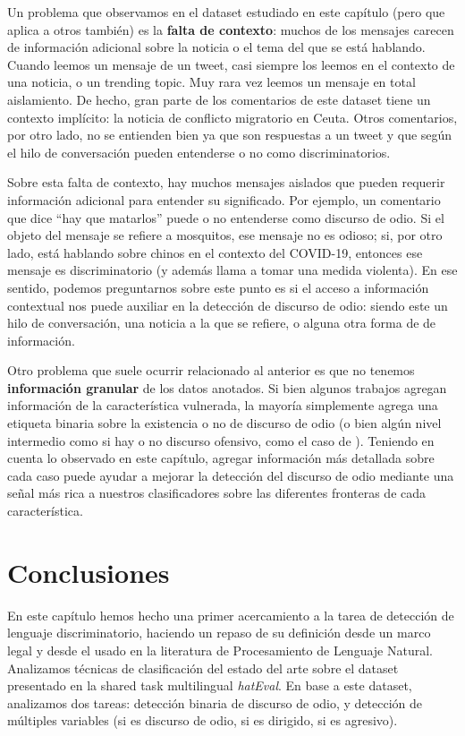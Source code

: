 
Un problema que observamos en el dataset estudiado en este capítulo (pero que aplica a otros también) es la \textbf{falta de contexto}: muchos de los mensajes carecen de información adicional sobre la noticia o el tema del que se está hablando. Cuando leemos un mensaje de un tweet, casi siempre los leemos en el contexto de una noticia, o un trending topic. Muy rara vez leemos un mensaje en total aislamiento. De hecho, gran parte de los comentarios de este dataset tiene un contexto implícito: la noticia de conflicto migratorio en Ceuta. Otros comentarios, por otro lado, no se entienden bien ya que son respuestas a un tweet y que según el hilo de conversación pueden entenderse o no como discriminatorios.

Sobre esta falta de contexto, hay muchos mensajes aislados que pueden requerir información adicional para entender su significado. Por ejemplo, un comentario que dice ``hay que matarlos'' puede o no entenderse como discurso de odio. Si el objeto del mensaje se refiere a mosquitos, ese mensaje no es odioso; si, por otro lado, está hablando sobre chinos en el contexto del COVID-19, entonces ese mensaje es discriminatorio (y además llama a tomar una medida violenta). En ese sentido, podemos preguntarnos sobre este punto es si el acceso a información contextual nos puede auxiliar en la detección de discurso de odio: siendo este un hilo de conversación, una noticia a la que se refiere, o alguna otra forma de de información.

Otro problema que suele ocurrir relacionado al anterior es que no tenemos \textbf{información granular} de los datos anotados. Si bien algunos trabajos agregan información de la característica vulnerada, la mayoría simplemente agrega una etiqueta binaria sobre la existencia o no de discurso de odio (o bien algún nivel intermedio como si hay o no discurso ofensivo, como el caso de \citet{Davidson2017AutomatedHS}). Teniendo en cuenta lo observado en este capítulo, agregar información más detallada sobre cada caso puede ayudar a mejorar la detección del discurso de odio mediante una señal más rica a nuestros clasificadores sobre las diferentes fronteras de cada característica.


\section{Conclusiones}

En este capítulo hemos hecho una primer acercamiento a la tarea de detección de lenguaje discriminatorio, haciendo un repaso de su definición desde un marco legal y desde el usado en la literatura de Procesamiento de Lenguaje Natural. Analizamos técnicas de clasificación del estado del arte sobre el dataset presentado en la shared task multilingual \emph{hatEval}\cite{hateval2019semeval}. En base a este dataset, analizamos dos tareas: detección binaria de discurso de odio, y detección de múltiples variables (si es discurso de odio, si es dirigido, si es agresivo).

